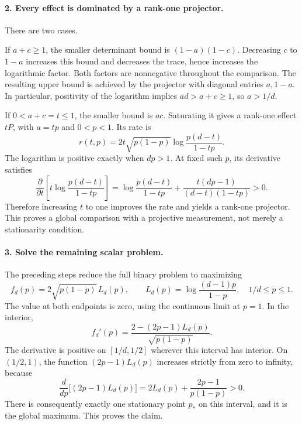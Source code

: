 \documentclass[11pt,a4paper]{article}
\begin{document}
\paragraph{2. Every effect is dominated by a rank-one projector.} There are two cases.

If $a+c\geq1$, the smaller determinant bound is $(1-a)(1-c)$. Decreasing $c$ to $1-a$ increases this bound and decreases the trace, hence increases the logarithmic factor. Both factors are nonnegative throughout the comparison. The resulting upper bound is achieved by the projector with diagonal entries $a,1-a$. In particular, positivity of the logarithm implies $ad>a+c\geq1$, so $a>1/d$.

If $0<a+c=t\leq1$, the smaller bound is $ac$. Saturating it gives a rank-one effect $tP$, with $a=tp$ and $0<p<1$. Its rate is
\[r(t,p)=2t\sqrt{p(1-p)}\log\frac{p(d-t)}{1-tp}.\]
The logarithm is positive exactly when $dp>1$. At fixed such $p$, its derivative satisfies
\[\frac{\partial}{\partial t}\left[t\log\frac{p(d-t)}{1-tp}\right]=\log\frac{p(d-t)}{1-tp}+\frac{t(dp-1)}{(d-t)(1-tp)}>0.\]
Therefore increasing $t$ to one improves the rate and yields a rank-one projector. This proves a global comparison with a projective measurement, not merely a stationarity condition.
\paragraph{3. Solve the remaining scalar problem.} The preceding steps reduce the full binary problem to maximizing
\[f_d(p)=2\sqrt{p(1-p)}\,L_d(p),\qquad L_d(p)=\log\frac{(d-1)p}{1-p},\quad 1/d\leq p\leq1.\]
The value at both endpoints is zero, using the continuous limit at $p=1$. In the interior,
\[f_d'(p)=\frac{2-(2p-1)L_d(p)}{\sqrt{p(1-p)}}.\]
The derivative is positive on $[1/d,1/2]$ wherever this interval has interior. On $(1/2,1)$, the function $(2p-1)L_d(p)$ increases strictly from zero to infinity, because
\[\frac{d}{dp}\big[(2p-1)L_d(p)\big]=2L_d(p)+\frac{2p-1}{p(1-p)}>0.\]
There is consequently exactly one stationary point $p_*$ on this interval, and it is the global maximum. This proves the claim.
\end{document}
